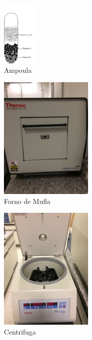 \documentclass[prd,amsfonts,onecolumn,superscriptaddress,aps,nofootinbib,11pt]{revtex4}
\begin{document}
\begin{figure}[H]
    \centering
    \includegraphics[width=0.15\textwidth]{experiments/Ampole.png}
    \caption{Ampoula}
    \label{fig:exp:ampole}
\end{figure}



\begin{figure}[H]
    \centering
    \includegraphics[width=0.4\textwidth]{experiments/forno_mufla.jpeg}
    \caption{Forno de Mufla}
    \label{fig:exp:forno}
\end{figure}



\begin{figure}[H]
    \centering
    \includegraphics[width=0.4\textwidth]{experiments/centrifuga.jpeg}
    \caption{Centrifuga}
    \label{fig:exp:centrifuga}
\end{figure}
\end{document}
